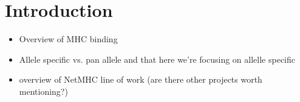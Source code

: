 \section*{Introduction}
\begin{itemize}
\item Overview of MHC binding
\item Allele specific vs. pan allele and that here we're focusing on allelle specific
\item overview of NetMHC line of work (are there other projects worth mentioning?)
\end{itemize}
